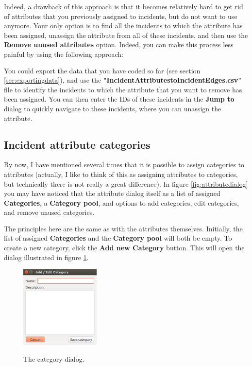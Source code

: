 \documentclass{memoir}
\begin{document}
Indeed, a drawback of this approach is that it becomes relatively hard to get rid of attributes that you previously assigned to incidents, but do not want to use anymore. Your only option is to find all the incidents to which the attribute has been assigned, unassign the attribute from all of these incidents, and then use the \textbf{Remove unused attributes} option. Indeed, you can make this process less painful by using the following approach:

You could export the data that you have coded so far (see section \ref{sec:exportingdata}), and use the \textbf{"Incident\textunderscore Attributes\textunderscore to\textunderscore Incident\textunderscore Edges.csv"} file to identify the incidents to which the attribute that you want to remove has been assigned. You can then enter the IDs of these incidents in the \textbf{Jump to} dialog to quickly navigate to these incidents, where you can unassign the attribute.


\subsection{Incident attribute categories}
\label{sec:incidentattributecategories}

By now, I have mentioned several times that it is possible to assign categories to attributes (actually, I like to think of this as assigning attributes to categories, but technically there is not really a great difference). In figure \ref{fig:attributedialog} you may have noticed that the attribute dialog itself as a list of assigned \textbf{Categories}, a \textbf{Category pool}, and options to add categories, edit categories, and remove unused categories.

The principles here are the same as with the attributes themselves. Initially, the list of assigned \textbf{Categories} and the \textbf{Category pool} will both be empty. To create a new category, click the \textbf{Add new Category} button. This will open the dialog illustrated in figure \ref{fig:categorydialog}.

\begin{figure}[h!]
  \centering
  \caption{The category dialog.}
  \includegraphics[width=40mm]{Screenshot_11.pdf}
  \label{fig:categorydialog}
\end{figure}
\end{document}
